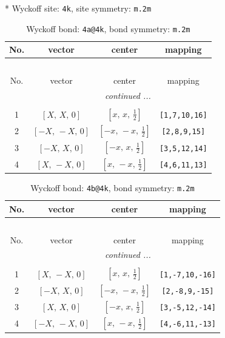 \documentclass[fleqn,8pt]{jsarticle}
\begin{document}
* Wyckoff site: {\tt 4k}, site symmetry: {\tt m.2m}
\renewcommand{\arraystretch}{1.2}
\begin{longtable}{cccc}
\caption{Wyckoff bond: {\tt 4a@4k}, bond symmetry: {\tt m.2m}}
 \\
 \hline \hline
No. & vector & center & mapping \\ \hline \endfirsthead

\multicolumn{3}{l}{\tablename\ \thetable{}} \\
 \hline \hline
No. & vector & center & mapping \\ \hline \endhead

 \hline \hline
\multicolumn{3}{r}{\footnotesize\it continued ...} \\ \endfoot

 \hline \hline
\multicolumn{3}{r}{} \\ \endlastfoot

1 & $\left[ X,\, X,\, 0 \right]$ & $\left[ x,\, x,\, \frac{1}{2} \right]$ & {\tt [1,7,10,16]} \\ \hline
2 & $\left[ - X,\, - X,\, 0 \right]$ & $\left[ - x,\, - x,\, \frac{1}{2} \right]$ & {\tt [2,8,9,15]} \\ \hline
3 & $\left[ - X,\, X,\, 0 \right]$ & $\left[ - x,\, x,\, \frac{1}{2} \right]$ & {\tt [3,5,12,14]} \\ \hline
4 & $\left[ X,\, - X,\, 0 \right]$ & $\left[ x,\, - x,\, \frac{1}{2} \right]$ & {\tt [4,6,11,13]} \\
\end{longtable}
\renewcommand{\arraystretch}{1.2}
\begin{longtable}{cccc}
\caption{Wyckoff bond: {\tt 4b@4k}, bond symmetry: {\tt m.2m}}
 \\
 \hline \hline
No. & vector & center & mapping \\ \hline \endfirsthead

\multicolumn{3}{l}{\tablename\ \thetable{}} \\
 \hline \hline
No. & vector & center & mapping \\ \hline \endhead

 \hline \hline
\multicolumn{3}{r}{\footnotesize\it continued ...} \\ \endfoot

 \hline \hline
\multicolumn{3}{r}{} \\ \endlastfoot

1 & $\left[ X,\, - X,\, 0 \right]$ & $\left[ x,\, x,\, \frac{1}{2} \right]$ & {\tt [1,-7,10,-16]} \\ \hline
2 & $\left[ - X,\, X,\, 0 \right]$ & $\left[ - x,\, - x,\, \frac{1}{2} \right]$ & {\tt [2,-8,9,-15]} \\ \hline
3 & $\left[ X,\, X,\, 0 \right]$ & $\left[ - x,\, x,\, \frac{1}{2} \right]$ & {\tt [3,-5,12,-14]} \\ \hline
4 & $\left[ - X,\, - X,\, 0 \right]$ & $\left[ x,\, - x,\, \frac{1}{2} \right]$ & {\tt [4,-6,11,-13]} \\
\end{longtable}
\end{document}
